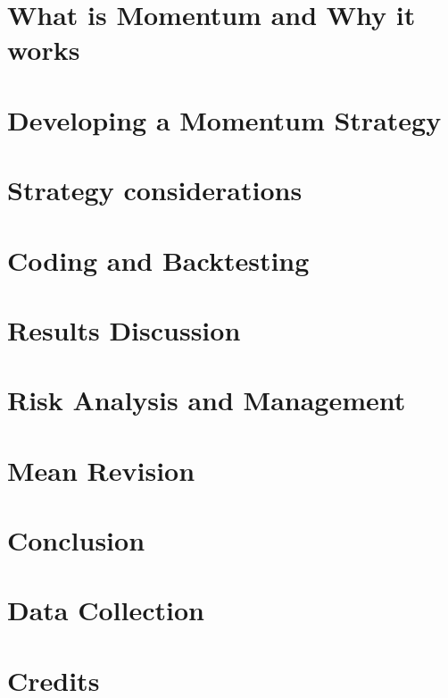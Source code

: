 \documentclass[a4paper]{article}
\begin{document}
\section{What is Momentum and Why it works}

\newpage

\section{Developing a Momentum Strategy}

\newpage

\section{Strategy considerations}

\newpage

\section{Coding and Backtesting}

\newpage

\section{Results Discussion}

\newpage

\section{Risk Analysis and Management}

\newpage

\section{Mean Revision}

\newpage

\section{Conclusion}

\newpage

\appendix
\section{Data Collection}

\newpage

\section{Credits}

\newpage
\end{document}
